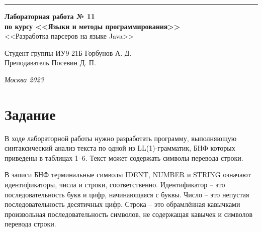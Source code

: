 \documentclass[a4paper, 14pt]{extarticle}
\begin{document}
\begin{titlepage}
\vspace*{-16pt}
\hspace{30pt}\rule{0.866\textwidth}{0.4pt}
  
\vspace{11em}

\begin{center}
\Large {\bf Лабораторная работа № 11} \\ 
\large {\bf по курсу <<Языки и методы программирования>>} \\
\large <<Разработка парсеров на языке Java>> 
\end{center}\normalsize

\vspace{8em}


\begin{flushright}
  {Студент группы ИУ9-21Б Горбунов А. Д. \hspace*{15pt}\\ 
  \vspace{2ex}
  Преподаватель Посевин Д. П.\hspace*{15pt}}
\end{flushright}

\bigskip

\vfill
 

\begin{center}
\textsl{Москва 2023}
\end{center}
\end{titlepage}

\renewcommand{\ttdefault}{pcr}

\setlength{\tabcolsep}{3pt}
\newpage
\setcounter{page}{2}

\section{Задание}\label{Sect::task}
	В ходе лабораторной работы нужно разработать программу, выполняющую синтаксический анализ текста по одной из LL(1)-грамматик, БНФ которых приведены в таблицах 1–6. Текст может содержать символы перевода строки. 
 
    В записи БНФ терминальные символы IDENT, NUMBER и STRING означают идентификаторы, числа и строки, соответственно. Идентификатор – это последовательность букв и цифр, начинающаяся с буквы. Число – это непустая последовательность десятичных цифр. Строка – это обрамлённая кавычками произвольная последовательность символов, не содержащая кавычек и символов перевода строки.
 
\end{document}
